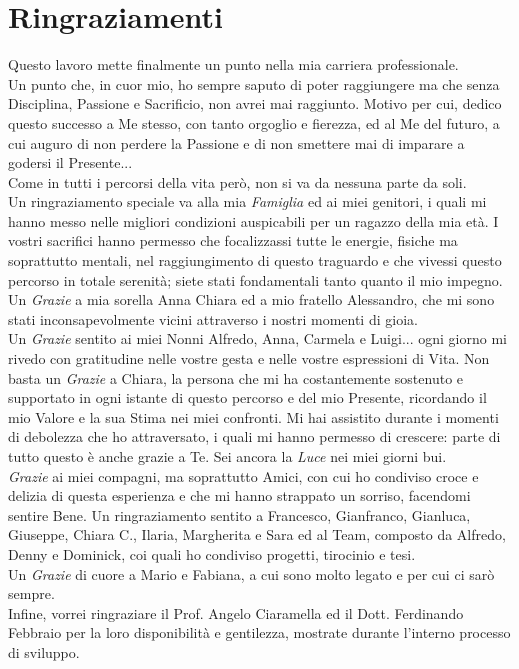 \chapter*{Ringraziamenti}
\noindent Questo lavoro mette finalmente un punto nella mia carriera professionale.\\
Un punto che, in cuor mio, ho sempre saputo di poter raggiungere ma che senza Disciplina, Passione e Sacrificio, non avrei mai raggiunto. Motivo per cui, dedico questo successo a Me stesso, con tanto orgoglio e fierezza, ed al Me del futuro, a cui auguro di non perdere la Passione e di non smettere mai di imparare a godersi il Presente... \\
Come in tutti i percorsi della vita però, non si va da nessuna parte da soli.\\ Un ringraziamento speciale va alla mia \textit{Famiglia} ed ai miei genitori, i quali mi hanno messo nelle migliori condizioni auspicabili per un ragazzo della mia età. I vostri sacrifici hanno permesso che focalizzassi tutte le energie, fisiche ma soprattutto mentali, nel raggiungimento di questo traguardo e che vivessi questo percorso in totale serenità; siete stati fondamentali tanto quanto il mio impegno. Un \textit{Grazie} a mia sorella Anna Chiara ed a mio fratello Alessandro, che mi sono stati inconsapevolmente vicini attraverso i nostri momenti di gioia.\\
Un \textit{Grazie} sentito ai miei Nonni Alfredo, Anna, Carmela e Luigi... ogni giorno mi rivedo con gratitudine nelle vostre gesta e nelle vostre espressioni di Vita.
Non basta un \textit{Grazie} a Chiara, la persona che mi ha costantemente sostenuto e supportato in ogni istante di questo percorso e del mio Presente, ricordando il mio Valore e la sua Stima nei miei confronti. Mi hai assistito durante i momenti di debolezza che ho attraversato, i quali mi hanno permesso di crescere: parte di tutto questo è anche grazie a Te. Sei ancora la \textit{Luce} nei miei giorni bui.\\
\textit{Grazie} ai miei compagni, ma soprattutto Amici, con cui ho condiviso croce e delizia di questa esperienza e che mi hanno strappato un sorriso, facendomi sentire Bene. Un ringraziamento sentito a Francesco, Gianfranco, Gianluca, Giuseppe, Chiara C., Ilaria, Margherita e Sara ed al Team, composto da Alfredo, Denny e Dominick, coi quali ho condiviso progetti, tirocinio e tesi.\\
Un \textit{Grazie} di cuore a Mario e Fabiana, a cui sono molto legato e per cui ci sarò sempre.\\
Infine, vorrei ringraziare il Prof. Angelo Ciaramella ed il Dott. Ferdinando Febbraio per la loro disponibilità e gentilezza, mostrate durante l'interno processo di sviluppo. 
